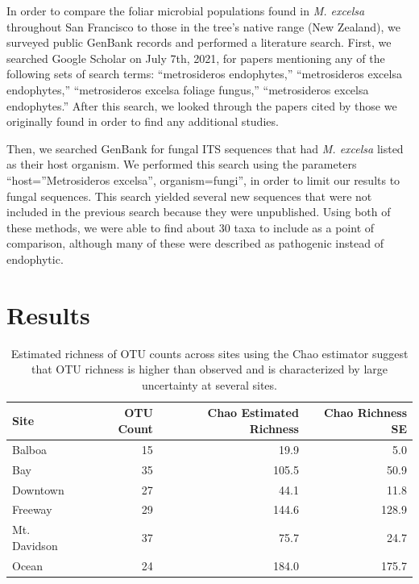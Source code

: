 \documentclass[fleqn,10pt,lineno]{wlpeerj} %
\begin{document}
In order to compare the foliar microbial populations found in \emph{M. excelsa} throughout San Francisco to those in the tree's native range (New Zealand), we surveyed public GenBank records and performed a literature search. First, we searched Google Scholar on July 7th, 2021, for papers mentioning any of the following sets of search terms: ``metrosideros endophytes,'' ``metrosideros excelsa endophytes,'' ``metrosideros excelsa foliage fungus,'' ``metrosideros excelsa endophytes.'' After this search, we looked through the papers cited by those we originally found in order to find any additional studies.

Then, we searched GenBank for fungal ITS sequences that had \emph{M. excelsa} listed as their host organism. We performed this search using the parameters ``host=''Metrosideros excelsa'', organism=fungi'', in order to limit our results to fungal sequences. This search yielded several new sequences that were not included in the previous search because they were unpublished. Using both of these methods, we were able to find about 30 taxa to include as a point of comparison, although many of these were described as pathogenic instead of endophytic.

\hypertarget{results}{%
\section*{Results}\label{results}}

\begin{table}[!h]

\caption{\label{tab:chao-richness}Estimated richness of OTU counts across sites using the Chao estimator suggest that OTU richness is higher than observed and is characterized by large uncertainty at several sites.}
\centering
\begin{tabular}[t]{lrrr}
\toprule
Site & OTU Count & Chao Estimated Richness & Chao Richness SE\\
\midrule
Balboa & 15 & 19.9 & 5.0\\
Bay & 35 & 105.5 & 50.9\\
Downtown & 27 & 44.1 & 11.8\\
Freeway & 29 & 144.6 & 128.9\\
Mt. Davidson & 37 & 75.7 & 24.7\\
Ocean & 24 & 184.0 & 175.7\\
\bottomrule
\end{tabular}
\end{table}
\end{document}

